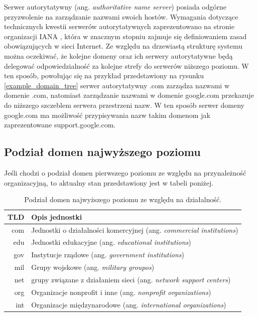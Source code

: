 Serwer autorytatywny (ang. \textit{authoritative name server}) posiada odgórne przyzwolenie na zarządzanie nazwami swoich hostów.
Wymagania dotyczące technicznych kwestii serwerów autorytatywnych zaprezentowano na stronie organizacji IANA \cite{iana},
która w znacznym
stopniu zajmuje się definiowaniem zasad obowiązujących w sieci Internet. Ze względu na drzewiastą strukturę systemu można oczekiwać,
że kolejne domeny oraz ich serwery
autorytatywne będą delegować odpowiedzialność za kolejne strefy do serwerów niższego poziomu. W ten sposób, powołując się na przykład
przedstawiony na rysunku \ref{example_domain_tree} serwer autorytatywny .com zarządza nazwami w domenie .com, natomiast zarządzanie
nazwami w domenie google.com przekazuje do niższego szczeblem serwera przestrzeni nazw. W ten sposób serwer domeny google.com ma
możliwość przypisywania nazw takim domenom jak zaprezentowane support.google.com.

\subsection{Podział domen najwyższego poziomu}
Jeśli chodzi o podział domen pierwszego poziomu ze względu na przynależność organizacyjną, to aktualny stan przedstawiony jest w
tabeli poniżej.

\begin{table}[h]
	\centering
	\caption{Podział domen najwyższego poziomu ze względu na działalność.}
	\label{podzial_tld}
	\begin{tabular}{|r|p{10.5cm}|}
		\hline
		\textbf{TLD} & \textbf{Opis jednostki} \\
		\hline\hline
		com & Jednostki o działalności komercyjnej (ang. \textit{commercial institutions}) \\
		\hline
		edu & Jednostki edukacyjne (ang. \textit{educational institutions})\\
		\hline
		gov & Instytucje rządowe (ang. \textit{government institutions}) \\
		\hline
		mil & Grupy wojskowe (ang. \textit{military groupos}) \\
		\hline
		net & grupy związane z działaniem sieci (ang. \textit{network support centers}) \\
		\hline
		org & Organizacje nonprofit i inne (ang. \textit{nonprofit organizations}) \\
		\hline
		int & Organizacje międzynarodowe (ang. \textit{international organizations}) \\
		\hline
	\end{tabular}
\end{table}

